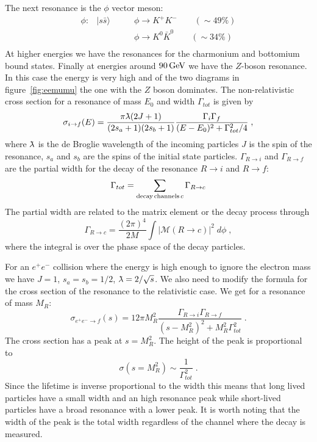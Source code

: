 \documentclass[12pt]{article}
\newcommand{\lambdabar}{{\mkern0.75mu\mathchar'26\mkern -9.75mu\lambda}}
\begin{document}
The next resonance is the $\phi$ vector meson:
\begin{eqnarray*}
\phi:& |s\bar s \rangle &
\qquad\phi\rightarrow K^+ K^- \quad\quad(\sim 49\%)\\ 
&&
\qquad\phi\rightarrow K^0 \bar K^0 \quad\quad(\sim 34\%)\\ 
\end{eqnarray*} 
At higher energies we have the resonances for the charmonium and bottomium bound states. Finally at energies around $90\,{\rm GeV}$ we have the $Z$-boson resonance. In this case the energy is very high and of the two diagrams in figure~\ref{fig:eemumu} the one with the $Z$ boson dominates.
The non-relativistic cross section for a resonance of mass $E_0$ and width $\Gamma_{tot}$ is given by
\[\sigma_{i\rightarrow f}(E)=\frac{\pi\lambdabar (2J+1)}{(2s_a+1)(2s_b+1)}\frac{\Gamma_i \Gamma_f}{(E-E_0)^2+\Gamma_{tot}^2/4}\;,\] 
where $\lambdabar$ is the de Broglie wavelength of the incoming particles  $J$ is the spin of the resonance, $s_a$ and $s_b$ are the spins of the initial state particles. $\Gamma_{R\rightarrow i}$ and $\Gamma_{R\rightarrow f}$ are the partial width for the decay of the resonance $R\rightarrow i$ and $R\rightarrow f$:
\[\Gamma_{tot} = \sum\limits_{ {\rm decay\,channels}\,c} \Gamma_{R\rightarrow c}\]
The partial width are related to the matrix element or the decay process through
\[\Gamma_{R\rightarrow c}=\frac{(2\pi)^4}{2M}\int \left| \mathcal{M}(R\rightarrow c) \right|^2 \;d \phi\;,\]
where the integral is over the phase space of the decay particles. 

For an $e^+e^-$ collision where the energy is high enough to ignore the electron mass we have $J=1$, $s_a=s_b=1/2$, $\lambdabar=2/\sqrt{s}$. We also need to modify the formula for the cross section of the resonance to the relativistic case. We get for a resonance of mass $M_R$:
\[\sigma_{e^+e^-\rightarrow f}(s)=12\pi M_R^2\frac{\Gamma_{R\rightarrow i}\Gamma_{R\rightarrow f}}{(s-M_R^2)^2+M_R^2\Gamma^2_{tot}}\;.\] 
The cross section has a peak at $s=M_R^2$. The height of the peak is proportional to 
\[\sigma(s=M_R^2)\sim \frac{1}{\Gamma_{tot}^2}\;.\]
Since the lifetime is inverse proportional to the width this means that long lived particles have a small width and an high resonance peak while short-lived particles have a broad resonance with a lower peak. It is worth noting that the width of the peak is the total width regardless of the channel where the decay is measured. 
\clearpage
%
%
\end{document}
